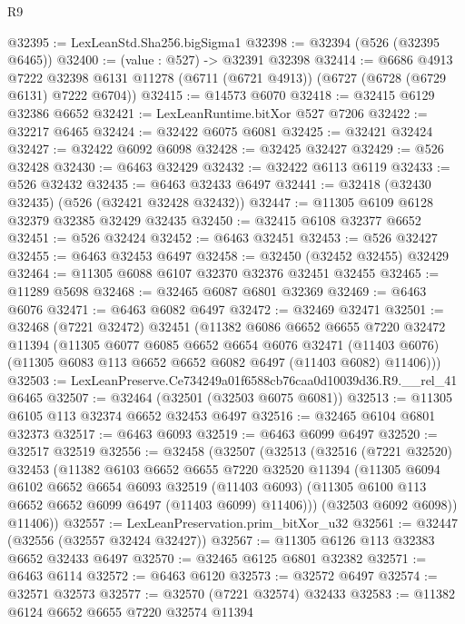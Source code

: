 \begin{lexlean}{R9}
\begin{coremodule}
@32395 := LexLeanStd.Sha256.bigSigma1
@32398 := @32394 (@526 (@32395 @6465))
@32400 := (value : @527) -> @32391 @32398
@32414 := @6686
    @4913
    @7222
    @32398
    @6131
    @11278
    (@6711 (@6721 @4913))
    (@6727 (@6728 (@6729 @6131) @7222 @6704))
@32415 := @14573 @6070
@32418 := @32415 @6129 @32386 @6652
@32421 := LexLeanRuntime.bitXor @527 @7206
@32422 := @32217 @6465
@32424 := @32422 @6075 @6081
@32425 := @32421 @32424
@32427 := @32422 @6092 @6098
@32428 := @32425 @32427
@32429 := @526 @32428
@32430 := @6463 @32429
@32432 := @32422 @6113 @6119
@32433 := @526 @32432
@32435 := @6463 @32433 @6497
@32441 := @32418 (@32430 @32435) (@526 (@32421 @32428 @32432))
@32447 := @11305 @6109 @6128 @32379 @32385 @32429 @32435
@32450 := @32415 @6108 @32377 @6652
@32451 := @526 @32424
@32452 := @6463 @32451
@32453 := @526 @32427
@32455 := @6463 @32453 @6497
@32458 := @32450 (@32452 @32455) @32429
@32464 := @11305 @6088 @6107 @32370 @32376 @32451 @32455
@32465 := @11289 @5698
@32468 := @32465 @6087 @6801 @32369
@32469 := @6463 @6076
@32471 := @6463 @6082 @6497
@32472 := @32469 @32471
@32501 := @32468
    (@7221 @32472)
    @32451
    (@11382
      @6086
      @6652
      @6655
      @7220
      @32472
      @11394
      (@11305
        @6077
        @6085
        @6652
        @6654
        @6076
        @32471
        (@11403 @6076)
        (@11305 @6083 @113 @6652 @6652 @6082 @6497 (@11403 @6082) @11406)))
@32503 := LexLeanPreserve.Ce734249a01f6588cb76caa0d10039d36.R9.__rel_41 @6465
@32507 := @32464 (@32501 (@32503 @6075 @6081))
@32513 := @11305 @6105 @113 @32374 @6652 @32453 @6497
@32516 := @32465 @6104 @6801 @32373
@32517 := @6463 @6093
@32519 := @6463 @6099 @6497
@32520 := @32517 @32519
@32556 := @32458
    (@32507
      (@32513
        (@32516
          (@7221 @32520)
          @32453
          (@11382
            @6103
            @6652
            @6655
            @7220
            @32520
            @11394
            (@11305
              @6094
              @6102
              @6652
              @6654
              @6093
              @32519
              (@11403 @6093)
              (@11305 @6100 @113 @6652 @6652 @6099 @6497 (@11403 @6099) @11406)))
          (@32503 @6092 @6098))
        @11406))
@32557 := LexLeanPreservation.prim_bitXor_u32
@32561 := @32447 (@32556 (@32557 @32424 @32427))
@32567 := @11305 @6126 @113 @32383 @6652 @32433 @6497
@32570 := @32465 @6125 @6801 @32382
@32571 := @6463 @6114
@32572 := @6463 @6120
@32573 := @32572 @6497
@32574 := @32571 @32573
@32577 := @32570 (@7221 @32574) @32433
@32583 := @11382 @6124 @6652 @6655 @7220 @32574 @11394

\end{coremodule}
\end{lexlean}
